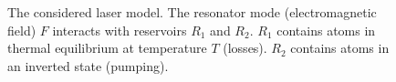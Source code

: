 \begin{figure}
\centering



\caption{The considered laser model. The resonator mode
  (electromagnetic field) $F$ interacts with reservoirs $R_1$ and
  $R_2$. $R_1$ contains atoms in thermal equilibrium at
  temperature $T$ (losses). $R_2$ contains atoms in an inverted
state (pumping).}
\label{figPart2Ch1_1}
\end{figure}